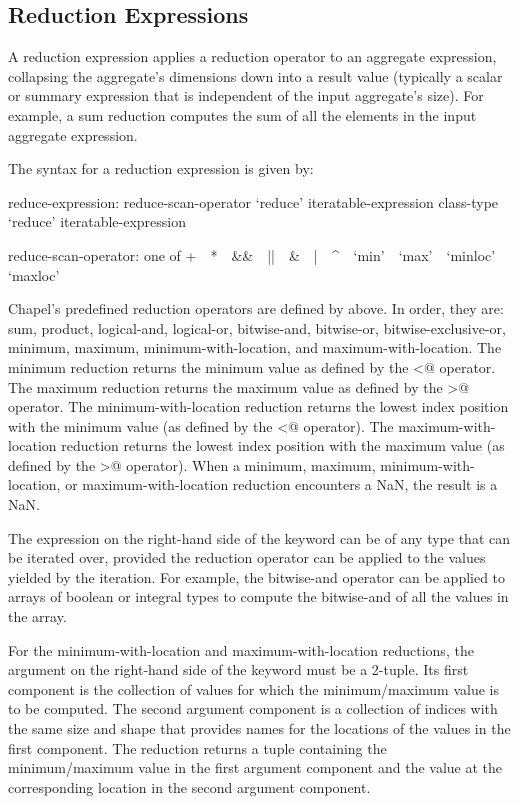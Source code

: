 \subsection{Reduction Expressions}
\label{reduce}

A reduction expression applies a reduction operator to an aggregate
expression, collapsing the aggregate's dimensions down into a result
value (typically a scalar or summary expression that is independent of
the input aggregate's size).  For example, a sum reduction computes
the sum of all the elements in the input aggregate expression.

The syntax for a reduction expression is given by:
\begin{syntax}
reduce-expression:
  reduce-scan-operator `reduce' iteratable-expression
  class-type `reduce' iteratable-expression

reduce-scan-operator: one of
  + $ $ $ $ * $ $ $ $ && $ $ $ $ || $ $ $ $ & $ $ $ $ | $ $ $ $ ^ $ $ $ $ `min' $ $ $ $ `max' $ $ $ $ `minloc' $ $ $ $ `maxloc'
\end{syntax}

Chapel's predefined reduction operators are defined
by  above.  In order, they are: sum,
product, logical-and, logical-or, bitwise-and, bitwise-or,
bitwise-exclusive-or, minimum, maximum, minimum-with-location, and
maximum-with-location.  The minimum reduction returns the minimum
value as defined by the \verb@<@ operator.  The maximum reduction
returns the maximum value as defined by the \verb@>@ operator.  The
minimum-with-location reduction returns the lowest index position with
the minimum value (as defined by the \verb@<@ operator).  The
maximum-with-location reduction returns the lowest index position with
the maximum value (as defined by the \verb@>@ operator).
When a minimum, maximum, minimum-with-location, or maximum-with-location
reduction encounters a NaN, the result is a NaN.

The expression on the right-hand side of the  keyword
can be of any type that can be iterated over, provided
the reduction operator can be applied to the values yielded
by the iteration. For example, the bitwise-and
operator can be applied to arrays of boolean or integral types to
compute the bitwise-and of all the values in the array.

For the minimum-with-location and maximum-with-location reductions,
the argument on the right-hand side of the  keyword
must be a 2-tuple. Its first component is the collection
of values for which the minimum/maximum value is to be computed.  The
second argument component is a collection of indices with the same size and
shape that provides names for the locations of the values in the first
component.  The reduction returns a tuple containing the
minimum/maximum value in the first argument component and the value
at the corresponding location in the second argument component.


